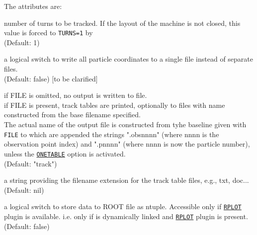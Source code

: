 The attributes are:
\begin{madlist}
    number of turns to be tracked. If the layout of the
   machine is not closed, this value is forced to {\tt TURNS=1} by \ptc 
   \\ (Default: 1)
     
   \label{opt:onetable2} a logical switch to write all
   particle coordinates to a single file instead of separate files. \\
   (Default: false) [to be clarified]

    if FILE is omitted, no output is written to file.\\
   if FILE is present, track tables are printed, optionally to 
   files with name constructed from the base filename specified. \\
   The actual name of the output file is constructed from
   tyhe baseline given with {\tt FILE} to which are appended the
   strings ".obsnnnn" (where nnnn is the observation point index) and
   ".pnnnn" (where nnnn is now the particle number), unless the
   \hyperref[opt:onetable2]{\tt ONETABLE} option is activated.  \\
   (Default: "track") 

    a string providing the filename extension for the
   track table files, e.g., txt, doc...  \\ (Default: nil)

    a logical switch to store data to ROOT file as
   ntuple. Accessible only if \hyperref[sec:rplot]{\tt RPLOT} plugin is
   available. i.e. only if \madx is dynamically linked and
   \hyperref[sec:rplot]{\tt RPLOT} plugin is present. \\ 
   (Default: false)


\end{madlist}
